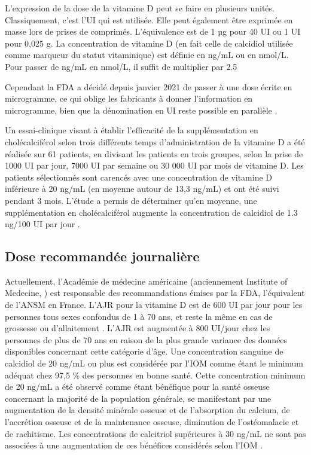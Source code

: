 \documentclass[
  a4paper,
  DIV=11,
  numbers=noendperiod,
  listof=totoc]{scrreprt}
\begin{document}
L'expression de la dose de la vitamine D peut se faire en plusieurs
unités. Classiquement, c'est l'\ac{UI} qui est utilisée. Elle peut
également être exprimée en masse lors de prises de comprimés.
L'équivalence est de 1 µg pour 40 \ac{UI} ou 1 \ac{UI} pour 0,025 g. La
concentration de vitamine D (en fait celle de calcidiol utilisée comme
marqueur du statut vitaminique) est définie en ng/mL ou en nmol/L. Pour
passer de ng/mL en nmol/L, il suffit de multiplier par 2.5
\autocite{Pramyothin.2012}

Cependant la \ac{FDA} a décidé depuis janvier 2021 de passer à une dose
écrite en microgramme, ce qui oblige les fabricants à donner
l'information en microgramme, bien que la dénomination en UI reste
possible en parallèle \autocite{HHS.2016}.

Un essai-clinique visant à établir l'efficacité de la supplémentation en
cholécalciférol selon trois différents temps d'administration de la
vitamine D a été réalisée sur 61 patients, en divisant les patients en
trois groupes, selon la prise de 1000 UI par jour, 7000 UI par semaine
ou 30 000 UI par mois de vitamine D. Les patients sélectionnés sont
carencés avec une concentration de vitamine D inférieure à 20 ng/mL (en
moyenne autour de 13,3 ng/mL) et ont été suivi pendant 3 mois. L'étude a
permis de déterminer qu'en moyenne, une supplémentation en
cholécalciférol augmente la concentration de calcidiol de 1.3 ng/100 UI
par jour \autocite{Takács.2017}.

\subsection{Dose recommandée
journalière}\label{dose-recommanduxe9e-journaliuxe8re}

Actuellement, l'Académie de médecine américaine (anciennement Institute
of Medecine, ) est responsable des recommandations émises par
la \ac{FDA}, l'équivalent de l'\ac{ANSM} en France. L'\ac{AJR} pour la
vitamine D est de 600 UI par jour pour les personnes tous sexes
confondus de 1 à 70 ans, et reste la même en cas de grossesse ou
d'allaitement \autocite{IOM.2011}. L'\ac{AJR} est augmentée à 800
UI/jour chez les personnes de plus de 70 ans en raison de la plus grande
variance des données disponibles concernant cette catégorie d'âge. Une
concentration sanguine de calcidiol de 20 ng/mL ou plus est considérée
par l'\ac{IOM} comme étant le minimum adéquat chez 97,5 \% des personnes
en bonne santé. Cette concentration minimum de 20 ng/mL a été observé
comme étant bénéfique pour la santé osseuse concernant la majorité de la
population générale, se manifestant par une augmentation de la densité
minérale osseuse et de l'absorption du calcium, de l'accrétion osseuse
et de la maintenance osseuse, diminution de l'ostéomalacie et de
rachitisme. Les concentrations de calcitriol supérieures à 30 ng/mL ne
sont pas associées à une augmentation de ces bénéfices considérés selon
l'\ac{IOM} \autocite{IOM.2011,Rosen.IOM.2012}.
\end{document}
